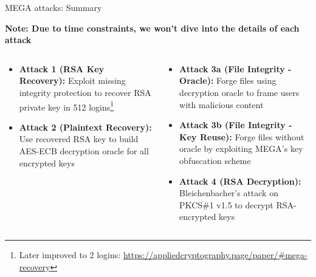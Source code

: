 \documentclass[aspectratio=169, lualatex, handout]{beamer}
\begin{document}
\begin{frame}{MEGA attacks: Summary}
	\begin{center}
		\textbf{Note: Due to time constraints, we won't dive into the details of each attack}
	\end{center}
	\begin{columns}[c]
		\begin{column}{0.5\textwidth}
			\begin{itemize}
				\item \textbf{Attack 1 (RSA Key Recovery):} Exploit missing integrity protection to recover RSA private key in 512 logins\footnote{Later improved to 2 logins: \url{https://appliedcryptography.page/paper/\#mega-recovery}}
				\item \textbf{Attack 2 (Plaintext Recovery):} Use recovered RSA key to build AES-ECB decryption oracle for all encrypted keys
			\end{itemize}
		\end{column}
		\begin{column}{0.5\textwidth}
			\begin{itemize}
				\item \textbf{Attack 3a (File Integrity - Oracle):} Forge files using decryption oracle to frame users with malicious content
				\item \textbf{Attack 3b (File Integrity - Key Reuse):} Forge files without oracle by exploiting MEGA's key obfuscation scheme
				\item \textbf{Attack 4 (RSA Decryption):} Bleichenbacher's attack on PKCS\#1 v1.5 to decrypt RSA-encrypted keys
			\end{itemize}
		\end{column}
	\end{columns}
\end{frame}
\end{document}

